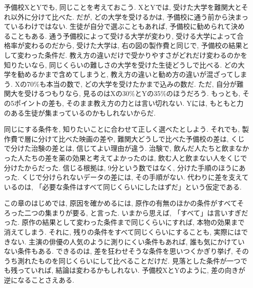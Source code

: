     予備校XとYでも, 同じことを考えておこう.
    XとYでは, 受けた大学を難関大とそれ以外に分けて比べた.
    だが, どの大学を受けるかは, 予備校に通う前から決まっているわけではない.
    生徒が自分で選ぶこともあれば, 予備校に勧められて決めることもある.
    通う予備校によって受ける大学が変わり, 受ける大学によって合格率が変わるのだから, 受けた大学は, 右の図の製作費と同じで, 予備校の結果として変わった条件だ.
    教え方の違いだけで受かりやすさがどれだけ変わるのかを知りたいなら, 同じくらいの難しさの大学を受けた生徒どうしで比べる.
    どの大学を勧めるかまで含めてしまうと, 教え方の違いと勧め方の違いが混ざってしまう.
    Xの70\%も本当の数で, どの大学を受けたかまで込みの数だ.
    ただ, 自分が難関大を受けるつもりなら, 見るのはXの30\%とYの35\%のほうだろう.
    もっとも, その5ポイントの差も, そのまま教え方の力とは言い切れない.
    Yには, もともと力のある生徒が集まっているのかもしれないからだ.

    同じにする条件を, 知りたいことに合わせて正しく選べたとしよう.
    それでも, 製作費で層に分けて比べた映画の差や, 難関大どうしで比べた予備校の差は, くじで分けた治験の差とは, 信じてよい理由が違う.
    治験で, 飲んだ人たちと飲まなかった人たちの差を薬の効果と考えてよかったのは, 飲む人と飲まない人をくじで分けたからだった.
    信じる根拠は, 9分という数ではなく, 分けた手順のほうにあった.
    くじで分けられないデータの差には, その手順がない.
    代わりに差を支えているのは, 「必要な条件はすべて同じくらいにしたはずだ」という仮定である.

    この章のはじめでは, 原因を確かめるには, 原作の有無のほかの条件がすべてそろった二つの集まりが要る, と言った.
    いまから思えば, 「すべて」は言いすぎだった.
    原作の結果として変わった条件まで同じくらいにすれば, 本物の効果まで消えてしまう.
    それに, 残りの条件をすべて同じくらいにすることも, 実際にはできない.
    主演の俳優の人気のように測りにくい条件もあれば, 誰も気にかけていない条件もある.
    できるのは, 差を狂わせそうな条件を思いつくかぎり挙げ, そのうち測れたものを同じくらいにして比べることだけだ.
    見落とした条件が一つでも残っていれば, 結論は変わるかもしれない.
    予備校XとYのように, 差の向きが逆になることさえある.
